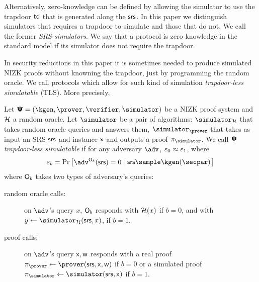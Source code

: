 Alternatively, zero-knowledge can be defined by allowing the simulator to use
the trapdoor $\mathsf{td}$ that is generated along the $\mathsf{srs}$. In this paper we distinguish
simulators that requires a trapdoor to simulate and those that do not. We call
the former \emph{SRS-simulators}. We say that a protocol is zero knowledge in
the standard model if its simulator does not require the trapdoor.


In security reductions in this paper it is sometimes needed to produce
simulated NIZK proofs without knowning the trapdoor, just by
programming the random oracle. We call protocols which allow for such kind of
simulation \emph{trapdoor-less simulatable} (TLS). More precisely,

\begin{definition}
  Let $\ps = (\kgen, \prover, \verifier, \simulator)$ be a NIZK proof
  system and $\mathcal{H}$ a random oracle. Let $\simulator$ be a pair of
  algorithms: $\simulator_\ro$ that takes random oracle queries and
  answers them, $\simulator_\prover$ that takes as input an SRS $\mathsf{srs}$
  and instance $\mathsf{x}$ and outputs a proof $\zkproof_\simulator$.  We
  call $\bm{\mathsf{\Psi}}$ \emph{trapdoor-less simulatable} if for any adversary
  $\adv$, $\varepsilon_0 \approx \varepsilon_1$, where
  \begin{align}
    \eps_b = \Pr\left[
    \begin{aligned}
      \adv^{\oracleo_b}(\srs) = 0
    \end{aligned}
    \, \left| \,
    \begin{aligned}
      \srs \sample \kgen(\secpar)
    \end{aligned}
    \right.\right]
  \end{align}
  where $\mathsf{O}_b$ takes two types of adversary's queries:
  \begin{description}
  \item[random oracle calls:] on $\adv$'s query $x$, $\mathsf{O}_b$
    responds with $\mathcal{H}(x)$ if $b = 0$, and with $y \gets
    \simulator_\ro(\srs, x)$, if $b = 1$.
  \item[proof calls:] on $\adv$'s query $\mathsf{x}, \mathsf{w}$ responds
  with a real proof $\zkproof_\prover \gets
  \prover(\srs, \inp, \wit)$ if $b = 0$ or a simulated proof $\zkproof_\simulator \gets \simulator (\srs,
  \inp)$ if $b = 1$. 
  \end{description} 
\end{definition}

